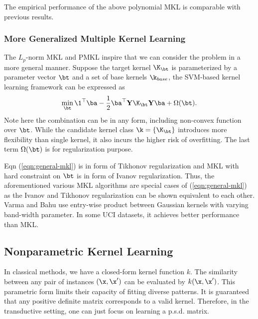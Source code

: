 The empirical performance of the above polynomial MKL is comparable with previous results.


\subsubsection{More Generalized Multiple Kernel Learning}

The $L_p$-norm MKL and PMKL inspire that we can consider the problem in a more general manner. Suppose the target kernel $\K_{\bt}$ is parameterized by a parameter vector $\bt$ and a set of base kernels $\k_{base}$, the SVM-based kernel learning framework can be expressed as\cite{icml/VarmaB09}
\begin{equation}
\min_\bt    \1^\top\ba - \frac{1}{2}\ba^\top\mathbf Y\K_\bt\mathbf Y\ba + \Omega(\bt).\label{eqn:general-mkl}
\end{equation}
Note here the combination can be in any form, including non-convex function over $\bt$. While the candidate kernel class $\k=\{\K_\bt\}$ introduces more flexibility than single kernel, it also incurs the higher risk of overfitting. The last term $\Omega(\bt)$ is for regularization purpose.

Eqn (\ref{eqn:general-mkl}) is in form of Tikhonov regularization and MKL with hard constraint on $\bt$ is in form of Ivanov regularization. Thus, the aforementioned various MKL algorithms are special cases of (\ref{eqn:general-mkl}) as the Ivanov and Tikhonov regularization can be shown equivalent to each other\cite{jmlr/KloftBSZ11}. Varma and Bahu use entry-wise product between Gaussian kernels with varying band-width parameter. In some UCI datasets, it achieves better performance than MKL.


\subsection{Nonparametric Kernel Learning}

In classical methods, we have a closed-form kernel function $k$. The similarity between any pair of instances $(\x,\x')$ can be evaluated by $k(\x,\x')$. This parametric form limits their capacity of fitting diverse patterns. It is guaranteed that any positive definite matrix corresponds to a valid kernel. Therefore, in the transductive setting, one can just focus on learning a p.s.d. matrix.

